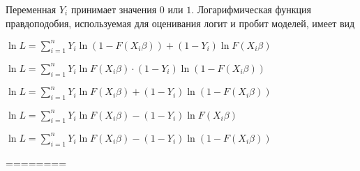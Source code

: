 
\begin{question}
Переменная \(Y_i\) принимает значения \(0\) или \(1\). Логарифмическая
функция правдоподобия, используемая для оценивания логит и пробит
моделей, имеет вид
\begin{answerlist}
  \item \(\ln L = \sum_{i=1}^n Y_i \ln (1 - F(X_i \beta)) + (1 - Y_i) \ln F(X_i \beta)\)
  \item \(\ln L = \sum_{i=1}^n Y_i \ln F(X_i \beta) \cdot (1 - Y_i) \ln (1 - F(X_i \beta))\)
  \item \(\ln L = \sum_{i=1}^n Y_i \ln F(X_i \beta) + (1 - Y_i) \ln (1 - F(X_i \beta))\)
  \item \(\ln L = \sum_{i=1}^n Y_i \ln F(X_i \beta) - (1 - Y_i) \ln F(X_i \beta)\)
  \item \(\ln L = \sum_{i=1}^n Y_i \ln F(X_i \beta) - (1 - Y_i) \ln (1 - F(X_i \beta))\)
\end{answerlist}
\end{question}

\begin{solution}
========
\end{solution}

